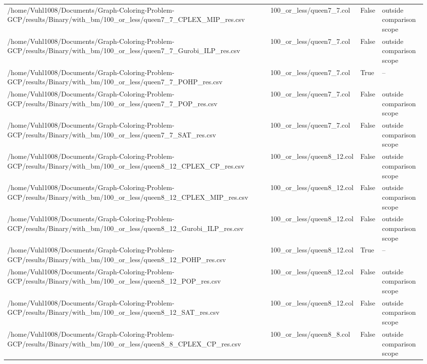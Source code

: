 \begin{table}[htbp]
\begin{tabular}{llll}
/home/Vuhl1008/Documents/Graph-Coloring-Problem-GCP/results/Binary/with\_bm/100\_or\_less/queen7\_7\_CPLEX\_MIP\_res.csv & 100\_or\_less/queen7\_7.col & False & outside comparison scope \\
/home/Vuhl1008/Documents/Graph-Coloring-Problem-GCP/results/Binary/with\_bm/100\_or\_less/queen7\_7\_Gurobi\_ILP\_res.csv & 100\_or\_less/queen7\_7.col & False & outside comparison scope \\
/home/Vuhl1008/Documents/Graph-Coloring-Problem-GCP/results/Binary/with\_bm/100\_or\_less/queen7\_7\_POHP\_res.csv & 100\_or\_less/queen7\_7.col & True & -- \\
/home/Vuhl1008/Documents/Graph-Coloring-Problem-GCP/results/Binary/with\_bm/100\_or\_less/queen7\_7\_POP\_res.csv & 100\_or\_less/queen7\_7.col & False & outside comparison scope \\
/home/Vuhl1008/Documents/Graph-Coloring-Problem-GCP/results/Binary/with\_bm/100\_or\_less/queen7\_7\_SAT\_res.csv & 100\_or\_less/queen7\_7.col & False & outside comparison scope \\
/home/Vuhl1008/Documents/Graph-Coloring-Problem-GCP/results/Binary/with\_bm/100\_or\_less/queen8\_12\_CPLEX\_CP\_res.csv & 100\_or\_less/queen8\_12.col & False & outside comparison scope \\
/home/Vuhl1008/Documents/Graph-Coloring-Problem-GCP/results/Binary/with\_bm/100\_or\_less/queen8\_12\_CPLEX\_MIP\_res.csv & 100\_or\_less/queen8\_12.col & False & outside comparison scope \\
/home/Vuhl1008/Documents/Graph-Coloring-Problem-GCP/results/Binary/with\_bm/100\_or\_less/queen8\_12\_Gurobi\_ILP\_res.csv & 100\_or\_less/queen8\_12.col & False & outside comparison scope \\
/home/Vuhl1008/Documents/Graph-Coloring-Problem-GCP/results/Binary/with\_bm/100\_or\_less/queen8\_12\_POHP\_res.csv & 100\_or\_less/queen8\_12.col & True & -- \\
/home/Vuhl1008/Documents/Graph-Coloring-Problem-GCP/results/Binary/with\_bm/100\_or\_less/queen8\_12\_POP\_res.csv & 100\_or\_less/queen8\_12.col & False & outside comparison scope \\
/home/Vuhl1008/Documents/Graph-Coloring-Problem-GCP/results/Binary/with\_bm/100\_or\_less/queen8\_12\_SAT\_res.csv & 100\_or\_less/queen8\_12.col & False & outside comparison scope \\
/home/Vuhl1008/Documents/Graph-Coloring-Problem-GCP/results/Binary/with\_bm/100\_or\_less/queen8\_8\_CPLEX\_CP\_res.csv & 100\_or\_less/queen8\_8.col & False & outside comparison scope \\

\end{tabular}
\end{table}
